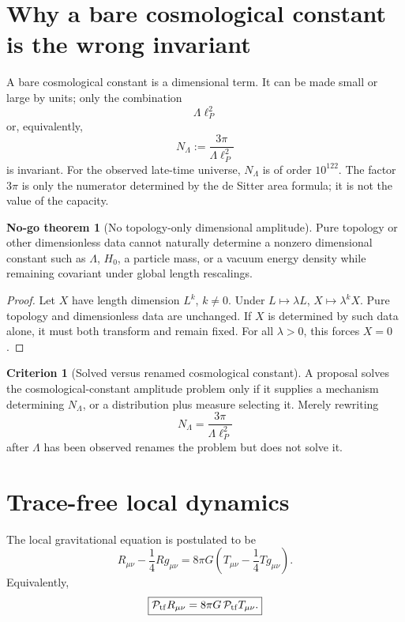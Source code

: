 \documentclass[aps,prd,reprint,nofootinbib,superscriptaddress]{revtex4-2}
\numberwithin{equation}{section}
\theoremstyle{definition}
\newtheorem{criterion}{Criterion}[section]
\newtheorem{nogotheorem}{No-go theorem}[section]
\theoremstyle{plain}
\newcommand{\Ptr}{\mathcal P_{\rm tf}}
\begin{document}
\section{Why a bare cosmological constant is the wrong invariant}

A bare cosmological constant is a dimensional term.  It can be made small or large by units; only the combination
\begin{equation}
\boxed{
\Lambda\ell_P^2
}
\end{equation}
or, equivalently,
\begin{equation}
\boxed{
N_\Lambda:=\frac{3\pi}{\Lambda\ell_P^2}
}
\end{equation}
is invariant.  For the observed late-time universe, \(N_\Lambda\) is of order \(10^{122}\).  The factor \(3\pi\) is only the numerator determined by the de Sitter area formula; it is not the value of the capacity.

\begin{nogotheorem}[No topology-only dimensional amplitude]\label{nogo:topology-amplitude}
Pure topology or other dimensionless data cannot naturally determine a nonzero dimensional constant such as \(\Lambda\), \(H_0\), a particle mass, or a vacuum energy density while remaining covariant under global length rescalings.
\end{nogotheorem}

\begin{proof}
Let \(X\) have length dimension \(L^k\), \(k\ne0\).  Under \(L\mapsto\lambda L\), \(X\mapsto\lambda^kX\).  Pure topology and dimensionless data are unchanged.  If \(X\) is determined by such data alone, it must both transform and remain fixed.  For all \(\lambda>0\), this forces \(X=0\).
\end{proof}

\begin{criterion}[Solved versus renamed cosmological constant]
A proposal solves the cosmological-constant amplitude problem only if it supplies a mechanism determining \(N_\Lambda\), or a distribution plus measure selecting it.  Merely rewriting
\[
N_\Lambda=\frac{3\pi}{\Lambda\ell_P^2}
\]
after \(\Lambda\) has been observed renames the problem but does not solve it.
\end{criterion}

\section{Trace-free local dynamics}

The local gravitational equation is postulated to be
\begin{equation}
\boxed{
R_{\mu\nu}-\frac14Rg_{\mu\nu}
=
8\pi G\left(T_{\mu\nu}-\frac14Tg_{\mu\nu}\right).
}
\label{eq:tracefree}
\end{equation}
Equivalently,
\begin{equation}
\boxed{
\Ptr R_{\mu\nu}=8\pi G\,\Ptr T_{\mu\nu}.
}
\end{equation}
\end{document}
